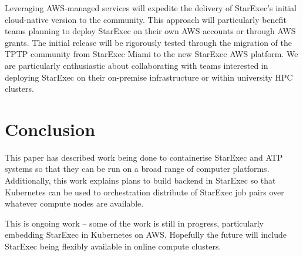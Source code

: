 \documentclass{easychair}
\begin{document}
Leveraging AWS-managed services %
will expedite the delivery of StarExec's initial cloud-native version to the community. 
This approach will particularly benefit teams planning to deploy StarExec on their own AWS 
accounts or through AWS grants.
The initial release will be rigorously tested through the migration of the TPTP community from 
StarExec Miami to the new StarExec AWS platform. 
We are particularly enthusiastic about collaborating with teams interested in deploying StarExec 
on their on-premise infrastructure or within university HPC clusters.

\section{Conclusion}
\label{Conclusion}

This paper has described work being done to containerise StarExec and ATP systems so that they 
can be run on a broad range of computer platforms.
Additionally, this work explains plans to build backend in StarExec so that Kubernetes can be 
used to orchestration distribute of StarExec job pairs over whatever compute nodes are available.

This is ongoing work -- some of the work is still in progress, particularly embedding StarExec in 
Kubernetes on AWS.
Hopefully the future will include StarExec being flexibly available in online compute clusters.



\appendix

\newpage
\end{document}
